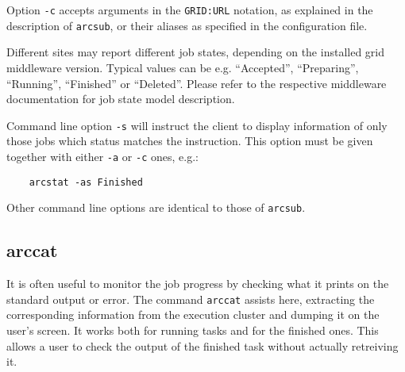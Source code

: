 Option \verb#-c# accepts arguments in the \texttt{GRID:URL} notation,
as explained in the description of \texttt{arcsub}, or their aliases as
specified in the configuration file.

Different sites may report different job states, depending on
the installed grid middleware version. Typical values can be e.g.
``Accepted'', ``Preparing'', ``Running'', ``Finished'' or ``Deleted''.
Please refer to the respective middleware documentation for job state model
description.

Command line option \verb#-s# will instruct the client to display information
of only those jobs which status matches the instruction. This option must be given
together with either \verb#-a# or \verb#-c# ones, e.g.:
\begin{verbatim}
    arcstat -as Finished
\end{verbatim}

Other command line options are identical to those of \verb#arcsub#.

\subsection{arccat}
\label{sec:arccat}

It is often useful to monitor the job progress by checking what it
prints on the standard output or error. The command \texttt{arccat}
 assists here, extracting the
corresponding information from the execution cluster and dumping it
on the user's screen. It works both for running tasks and for the
finished ones. This allows a user to check the output of the
finished task without actually retreiving it.

